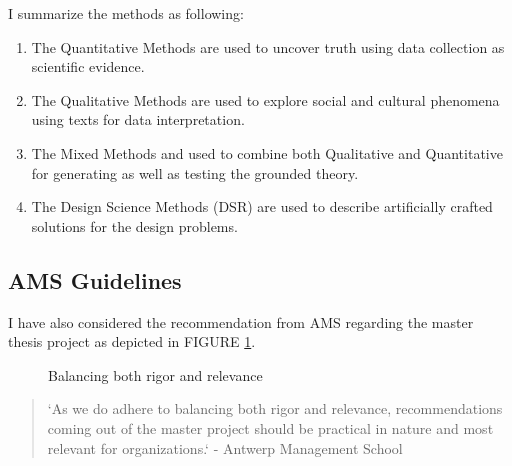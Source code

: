 I summarize the methods as following:

\begin{enumerate}

    \item The Quantitative Methods are used to uncover truth using data collection as scientific evidence.
    
    \item The Qualitative Methods are used to explore social and cultural phenomena using texts for data interpretation.
 
    \item The Mixed Methods and used to combine both Qualitative and Quantitative for generating as well as testing the grounded theory.
    
    \item The Design Science Methods (DSR) are used to describe artificially crafted solutions for the design problems.
    
\end{enumerate}

\subsection{AMS Guidelines}
I have also considered the recommendation from AMS regarding the master thesis project as depicted  in FIGURE \ref{fig:relevance-rigor}. 

\begin{figure}[ht]
    \centering
    \caption{Balancing both rigor and relevance}
    \label{fig:relevance-rigor}
\end{figure}
\begin{quote}
`As we do adhere to
balancing both rigor and relevance, recommendations coming out of the master project should be
practical in nature and most relevant for organizations.` 
- Antwerp Management School
\end{quote}

